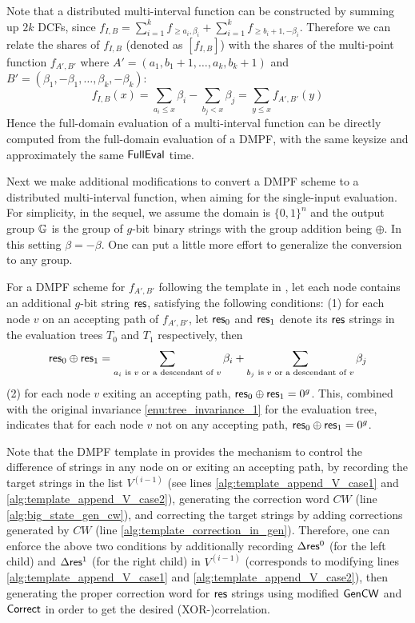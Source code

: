 Note that a distributed multi-interval function can be constructed by summing up $2k$ DCFs, since $f_{I,B} = \sum_{i=1}^k f_{\ge a_i,\beta_i} + \sum_{i=1}^k f_{\ge b_i+1, -\beta_i}$. Therefore we can relate the shares of $f_{I,B}$ (denoted as $[f_{I,B}]$) with the shares of the multi-point function $f_{A',B'}$ where $A' = (a_1,b_1+1,\dots,a_k,b_k+1)$ and $B' = (\beta_1,-\beta_1,\dots,\beta_k,-\beta_k)$: 
\[
  f_{I,B}(x)  = \sum_{a_i\le x}\beta_i - \sum_{b_j<x}\beta_j = \sum_{y\le x}f_{A',B'}(y)
\]
Hence the full-domain evaluation of a multi-interval function can be directly computed from the full-domain evaluation of a DMPF, with the same keysize and approximately the same ${\sf FullEval}$ time. 

Next we make additional modifications to convert a DMPF scheme to a distributed multi-interval function, when aiming for the single-input evaluation. For simplicity, in the sequel, we assume the domain is $\{0,1\}^n$ and the output group $\mathbb{G}$ is the group of $g$-bit binary strings with the group addition being $\oplus$. In this setting $\beta = -\beta$. One can put a little more effort to generalize the conversion to any group. 

For a DMPF scheme for $f_{A',B'}$ following the template in , let each node contains an additional $g$-bit string ${\sf res}$, satisfying the following conditions: (1) for each node $v$ on an accepting path of $f_{A',B'}$, let ${\sf res}_0$ and ${\sf res}_1$ denote its ${\sf res}$ strings in the evaluation trees $T_0$ and $T_1$ respectively, then 
\[
  {\sf res}_0\oplus {\sf res}_1 = \sum_{a_i\text{ is }v\text{ or a descendant of }v}\beta_i + \sum_{b_j\text{ is }v\text{ or a descendant of }v}\beta_j 
\]
(2) for each node $v$ exiting an accepting path, ${\sf res}_0\oplus {\sf res}_1 = 0^g$. This, combined with the original invariance \ref{enu:tree_invariance_1} for the evaluation tree, indicates that for each node $v$ not on any accepting path, ${\sf res}_0\oplus {\sf res}_1 = 0^g$. 

Note that the DMPF template in  provides the mechanism to control the difference of strings in any node on or exiting an accepting path, by recording the target strings in the list $V^{(i-1)}$ (see lines \ref{alg:template_append_V_case1} and \ref{alg:template_append_V_case2}), generating the correction word $CW$ (line \ref{alg:big_state_gen_cw}), and correcting the target strings by adding corrections generated by $CW$ (line \ref{alg:template_correction_in_gen}). Therefore, one can enforce the above two conditions by additionally recording $\Delta{\sf res}^0$ (for the left child) and $\Delta {\sf res}^1$ (for the right child) in $V^{(i-1)}$ (corresponds to modifying lines \ref{alg:template_append_V_case1} and \ref{alg:template_append_V_case2}), then generating the proper correction word for ${\sf res}$ strings using  modified ${\sf Gen}{\sf CW}$ and ${\sf Correct}$ in order to get the desired (XOR-)correlation. 

